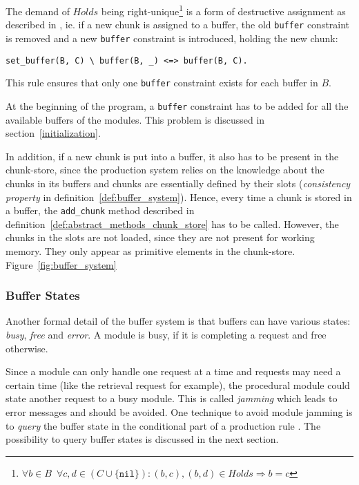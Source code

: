 The demand of $Holds$ being right-unique\footnote{$\forall b \in B \enspace \forall c, d \in (C \cup \{ \mathtt{nil} \}): (b,c), (b,d) \in Holds \Rightarrow b = c$} is a form of destructive assignment as described in \cite[p. 32]{fru_chr_book_2009}, ie. if a new chunk is assigned to a buffer, the old \verb|buffer| constraint is removed and a new \verb|buffer| constraint is introduced, holding the new chunk:

\begin{lstlisting}
set_buffer(B, C) \ buffer(B, _) <=> buffer(B, C).
\end{lstlisting}

This rule ensures that only one \verb|buffer| constraint exists for each buffer in $B$.

At the beginning of the program, a \verb|buffer| constraint has to be added for all the available buffers of the modules. This problem is discussed in section~\ref{initialization}.

In addition, if a new chunk is put into a buffer, it also has to be present in the chunk-store, since the production system relies on the knowledge about the chunks in its buffers and chunks are essentially defined by their slots (\emph{consistency property} in definition~\ref{def:buffer_system}). Hence, every time a chunk is stored in a buffer, the \verb|add_chunk| method described in definition~\ref{def:abstract_methods_chunk_store} has to be called. However, the chunks in the slots are not loaded, since they are not present for working memory. They only appear as primitive elements in the chunk-store. Figure~\ref{fig:buffer_system}


\subsubsection{Buffer States}

Another formal detail of the buffer system is that buffers can have various states: \emph{busy}, \emph{free} and \emph{error}. A module is busy, if it is completing a request and free otherwise.

Since a module can only handle one request at a time and requests may need a certain time (like the retrieval request for example), the procedural module could state another request to a busy module. This is called \emph{jamming} which leads to error messages and should be avoided. One technique to avoid module jamming is to \emph{query} the buffer state in the conditional part of a production rule \cite[unit 2, p. 9]{actr_tutorial}. The possibility to query buffer states is discussed in the next section.

